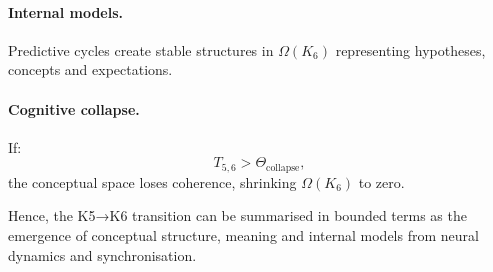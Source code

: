 \paragraph{Internal models.}
Predictive cycles create stable structures in $\Omega(K_6)$ representing
hypotheses, concepts and expectations.

\paragraph{Cognitive collapse.}
If:
\[
T_{5,6} > \Theta_{\mathrm{collapse}},
\]
the conceptual space loses coherence, shrinking $\Omega(K_6)$ to zero.

Hence, the K5→K6 transition can be summarised in bounded terms as the
emergence of conceptual structure, meaning and internal models from neural
dynamics and synchronisation.

